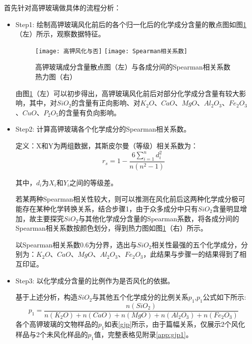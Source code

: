 \documentclass[withoutpreface,bwprint]{cumcmthesis} %
\begin{document}
首先针对高钾玻璃做具体的流程分析：
\begin{itemize}
	\item Step1: 绘制高钾玻璃风化前后的各个归一化后的化学成分含量的散点图如图\ref{gjfh}（左）所示，观察数据特征。
	
	\begin{figure}[!h]
		\centering
		\texttt{[image: 高钾风化与否]}
		\texttt{[image: Spearman相关系数]}
		\caption{高钾玻璃成分含量散点图（左）与各成分间的Spearman相关系数热力图（右）}
		\label{gjfh}
	\end{figure}
	
	由图\ref{gjfh}（左）可以初步得出，高钾玻璃风化前后对部分化学成分含量有较大影响，其中，对$SiO_{2}$的含量有正向影响、对$K_{2}O$、$CaO$、$MgO$、$Al_{2}O_{3}$、$Fe_{2}O_{3}$、$CuO$、$P_{2}O_{5}$的含量有负向影响。
	
	\item Step2: 计算高钾玻璃各个化学成分的Spearman相关系数。
	
	 定义：X和Y为两组数据，其斯皮尔曼（等级）相关系数为：
	 \[
	 r_{s}=1-\frac{6 \sum_{i=1}^{n} d_{i}^{2}}{n\left(n^{2}-1\right)}
	 \]
	
	 其中，$d_i$为$X_i$和$Y_i$之间的等级差。
	
	若某两种Spearman相关性较大，则可以推测在风化前后这两种化学成分极可能存在某种化学转换关系，结合步骤1，由于众多成分中只有$SiO_{2}$含量明显增加，故主要探究$SiO_{2}$与其他化学成分含量的Spearman系数，将各成分间的Spearman相关系数按颜色划分，得到热力图如图\ref{gjfh}（右）所示。
	
	
以Spearman相关系数0.6为分界，选出与$SiO_{2}$相关性最强的五个化学成分，分别为：$K_{2}O$、$CaO$、$MgO$、$Al_{2}O_{3}$、$Fe_{2}O_{3}$，此结果与步骤一的结果得到了相互印证。
	
	
	\item Step3: 以化学成分含量的比例作为是否风化的依据。
	
	 基于上述分析，构造$SiO_{2}$与其他五个化学成分的比例关系$p_{1}$,$p_{1}$公式如下所示: $$p_{1}=\frac{n(SiO_{2})}{n(K_{2}O)+n(CaO)+n(MgO)+n(Al_{2}O_{3})+n(Fe_{2}O_{3})}$$ 各个高钾玻璃的文物样品的$p_{1}$如表\ref{gjp}所示，由于篇幅关系，仅展示2个风化样品与2个未风化样品的$p_{1}$值，完整表格见附录\ref{app:gjp1}。
	

\end{itemize}
\end{document}

